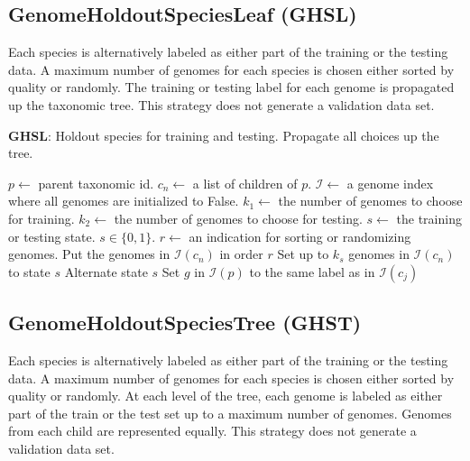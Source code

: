 \documentclass[12pt, letterpaper]{article}
\begin{document}
\newpage


\subsection{GenomeHoldoutSpeciesLeaf (GHSL)}
Each species is alternatively labeled as either part of the training or the testing data.  A maximum number of genomes for each species is chosen either sorted by quality or randomly.  The training or testing label for each genome is propagated up the taxonomic tree. This strategy does not generate a validation data set.

\begin{algorithm}[h!]
\caption{\textbf{GHSL}: Holdout species for training and testing.  Propagate all choices up the tree.}
\label{GHSL}
\begin{algorithmic}
\State $p \gets$ parent taxonomic id.
\State $c_n \gets$ a list of children of $p$.
\State $\mathcal{I} \gets$ a genome index where all genomes are initialized to False.
\State $k_1 \gets$ the number of genomes to choose for training.
\State $k_2 \gets$ the number of genomes to choose for testing.
\State $s \gets$ the training or testing state.  $s \in \{0, 1\}$.
\State $r \gets$ an indication for sorting or randomizing genomes.
 
\State Put the genomes in $\mathcal{I}(c_n)$ in order $r$
\State Set up to $k_s$ genomes in $\mathcal{I}(c_n)$ to state $s$
\State Alternate state $s$
\Else {}
\State Set $g$ in $\mathcal{I}(p)$ to the same label as in $\mathcal{I}(c_j)$
\EndFor
\EndFor
\EndIf
\EndProcedure
\end{algorithmic}
\end{algorithm}

\newpage

\subsection{GenomeHoldoutSpeciesTree (GHST)}
Each species is alternatively labeled as either part of the training or the testing data.  A maximum number of genomes for each species is chosen either sorted by quality or randomly.  At each level of the tree, each genome is labeled as either part of the train or the test set up to a maximum number of genomes. Genomes from each child are represented equally. This strategy does not generate a validation data set.
\end{document}
